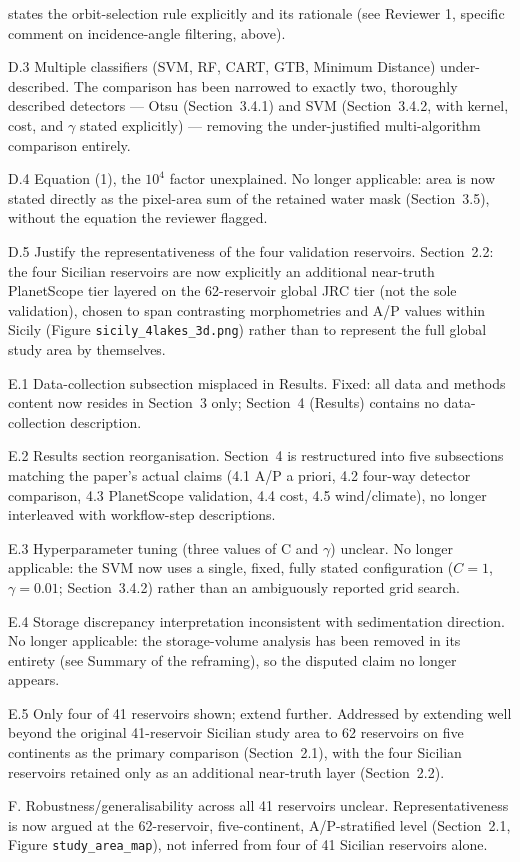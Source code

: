 \documentclass[11pt]{article}
\begin{document}
\begin{resp}
  states the orbit-selection rule explicitly and its rationale (see Reviewer
  1, specific comment on incidence-angle filtering, above).
  \item[D.3 Multiple classifiers (SVM, RF, CART, GTB, Minimum Distance)
  under-described.] The comparison has been narrowed to exactly two,
  thoroughly described detectors --- Otsu (Section~3.4.1) and SVM
  (Section~3.4.2, with kernel, cost, and $\gamma$ stated explicitly) ---
  removing the under-justified multi-algorithm comparison entirely.
  \item[D.4 Equation (1), the $10^4$ factor unexplained.] No longer
  applicable: area is now stated directly as the pixel-area sum of the
  retained water mask (Section~3.5), without the equation the reviewer
  flagged.
  \item[D.5 Justify the representativeness of the four validation
  reservoirs.] Section~2.2: the four Sicilian reservoirs are now explicitly
  an additional near-truth PlanetScope tier layered on the 62-reservoir
  global JRC tier (not the sole validation), chosen to span contrasting
  morphometries and A/P values within Sicily (Figure
  \texttt{sicily\_4lakes\_3d.png}) rather than to represent the full global
  study area by themselves.
  \item[E.1 Data-collection subsection misplaced in Results.] Fixed: all
  data and methods content now resides in Section~3 only; Section~4
  (Results) contains no data-collection description.
  \item[E.2 Results section reorganisation.] Section~4 is restructured into
  five subsections matching the paper's actual claims (4.1 A/P a priori, 4.2
  four-way detector comparison, 4.3 PlanetScope validation, 4.4 cost, 4.5
  wind/climate), no longer interleaved with workflow-step descriptions.
  \item[E.3 Hyperparameter tuning (three values of C and $\gamma$)
  unclear.] No longer applicable: the SVM now uses a single, fixed, fully
  stated configuration ($C=1$, $\gamma=0.01$; Section~3.4.2) rather than an
  ambiguously reported grid search.
  \item[E.4 Storage discrepancy interpretation inconsistent with
  sedimentation direction.] No longer applicable: the storage-volume
  analysis has been removed in its entirety (see Summary of the reframing),
  so the disputed claim no longer appears.
  \item[E.5 Only four of 41 reservoirs shown; extend further.] Addressed by
  extending well beyond the original 41-reservoir Sicilian study area to 62
  reservoirs on five continents as the primary comparison (Section~2.1), with
  the four Sicilian reservoirs retained only as an additional near-truth
  layer (Section~2.2).
  \item[F. Robustness/generalisability across all 41 reservoirs unclear.]
  Representativeness is now argued at the 62-reservoir, five-continent,
  A/P-stratified level (Section~2.1, Figure \texttt{study\_area\_map}), not
  inferred from four of 41 Sicilian reservoirs alone.
\end{resp}
\end{document}
